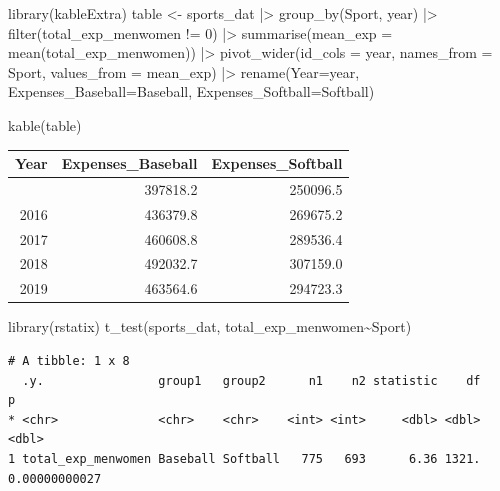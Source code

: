 \documentclass[
  letterpaper,
  DIV=11,
  numbers=noendperiod]{scrartcl}
\newenvironment{Shaded}{\begin{snugshade}}{\end{snugshade}}
\newcommand{\AttributeTok}[1]{\textcolor[rgb]{0.40,0.45,0.13}{#1}}
\newcommand{\DecValTok}[1]{\textcolor[rgb]{0.68,0.00,0.00}{#1}}
\newcommand{\FunctionTok}[1]{\textcolor[rgb]{0.28,0.35,0.67}{#1}}
\newcommand{\NormalTok}[1]{\textcolor[rgb]{0.00,0.23,0.31}{#1}}
\newcommand{\OtherTok}[1]{\textcolor[rgb]{0.00,0.23,0.31}{#1}}
\newcommand{\SpecialCharTok}[1]{\textcolor[rgb]{0.37,0.37,0.37}{#1}}
\begin{document}
\begin{Shaded}
\begin{Highlighting}[]
\FunctionTok{library}\NormalTok{(kableExtra)}
\NormalTok{table }\OtherTok{\textless{}{-}}\NormalTok{ sports\_dat }\SpecialCharTok{|\textgreater{}}
  \FunctionTok{group\_by}\NormalTok{(Sport, year) }\SpecialCharTok{|\textgreater{}}
  \FunctionTok{filter}\NormalTok{(total\_exp\_menwomen }\SpecialCharTok{!=} \DecValTok{0}\NormalTok{) }\SpecialCharTok{|\textgreater{}}
  \FunctionTok{summarise}\NormalTok{(}\AttributeTok{mean\_exp =} \FunctionTok{mean}\NormalTok{(total\_exp\_menwomen)) }\SpecialCharTok{|\textgreater{}}
  \FunctionTok{pivot\_wider}\NormalTok{(}\AttributeTok{id\_cols =}\NormalTok{ year, }\AttributeTok{names\_from =}\NormalTok{ Sport, }\AttributeTok{values\_from =}\NormalTok{ mean\_exp) }\SpecialCharTok{|\textgreater{}}
  \FunctionTok{rename}\NormalTok{(}\AttributeTok{Year=}\NormalTok{year, }\AttributeTok{Expenses\_Baseball=}\NormalTok{Baseball, }\AttributeTok{Expenses\_Softball=}\NormalTok{Softball)}

\FunctionTok{kable}\NormalTok{(table)}
\end{Highlighting}
\end{Shaded}

\begin{longtable}[]{@{}rrr@{}}
\toprule\noalign{}
Year & Expenses\_Baseball & Expenses\_Softball \\
\midrule\noalign{}
\endhead
\bottomrule\noalign{}
\endlastfoot
2015 & 397818.2 & 250096.5 \\
2016 & 436379.8 & 269675.2 \\
2017 & 460608.8 & 289536.4 \\
2018 & 492032.7 & 307159.0 \\
2019 & 463564.6 & 294723.3 \\
\end{longtable}

\begin{Shaded}
\begin{Highlighting}[]
\FunctionTok{library}\NormalTok{(rstatix)}
\FunctionTok{t\_test}\NormalTok{(sports\_dat, total\_exp\_menwomen}\SpecialCharTok{\textasciitilde{}}\NormalTok{Sport) }
\end{Highlighting}
\end{Shaded}

\begin{verbatim}
# A tibble: 1 x 8
  .y.                group1   group2      n1    n2 statistic    df             p
* <chr>              <chr>    <chr>    <int> <int>     <dbl> <dbl>         <dbl>
1 total_exp_menwomen Baseball Softball   775   693      6.36 1321. 0.00000000027
\end{verbatim}
\end{document}
